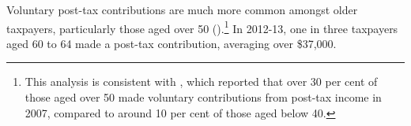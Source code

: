 \begin{subappendices}
\begin{figure}
\begin{minipage}[b][1.2\textheight][s]{\linewidth}
\begin{subfigure}{\columnwidth}
\end{subfigure}
\end{minipage}
\end{figure}

 
Voluntary post-tax contributions are much more common amongst older taxpayers, particularly those aged over 50 ().\footnote{This analysis is consistent with \textcite[][16]{FengGerransClark2014}, which reported that over 30 per cent of those aged over 50 made voluntary contributions from post-tax income in 2007, compared to around 10 per cent of those aged below 40.}  In 2012-13, one in three taxpayers aged 60 to 64 made a post-tax contribution, averaging over \$37,000. 

\addtocounter{figure}{-1}


\end{subappendices}
